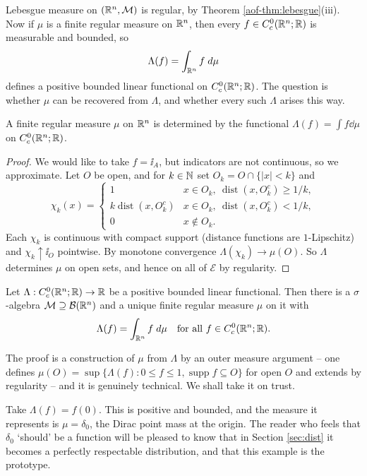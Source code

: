 \documentclass[a4paper]{scrartcl}
\DeclareMathOperator{\supp}{supp}
\DeclareMathOperator{\dist}{dist}
\begin{document}
Lebesgue measure on $(\mathbb{R}^n, \mathcal{M})$ is regular, by Theorem \ref{aof-thm:lebesgue}(iii). Now if $\mu$ is a finite regular measure on $\mathbb{R}^n$, then every $f \in C^0_c(\mathbb{R}^n;\mathbb{R})$ is measurable and bounded, so
$$\Lambda(f) = \int_{\mathbb{R}^n} f \; d \mu$$
defines a positive bounded linear functional on $C^0_c(\mathbb{R}^n;\mathbb{R})$. The question is whether $\mu$ can be recovered from $\Lambda$, and whether every such $\Lambda$ arises this way.

\begin{lemma}\label{lem:measuredetermined}
	A finite regular measure $\mu$ on $\mathbb{R}^n$ is determined by the functional $\Lambda(f) = \int f \dd\mu$ on $C_c^0(\mathbb{R}^n;\mathbb{R})$.
\end{lemma}

\begin{proof}
	We would like to take $f = \ii_A$, but indicators are not continuous, so we approximate. Let $O$ be open, and for $k \in \mathbb{N}$ set $O_k = O \cap \{|x| < k\}$ and
	$$\chi_k(x) = \begin{cases} 1 & x \in O_k, \ \dist(x, O_k^c) \ge 1/k, \\ k\dist(x, O_k^c) & x \in O_k, \ \dist(x,O_k^c) < 1/k, \\ 0 & x \notin O_k.\end{cases}$$
	Each $\chi_k$ is continuous with compact support (distance functions are $1$-Lipschitz) and $\chi_k \uparrow \ii_O$ pointwise. By monotone convergence $\Lambda(\chi_k) \to \mu(O)$. So $\Lambda$ determines $\mu$ on open sets, and hence on all of $\mathcal{E}$ by regularity.
\end{proof}

\begin{theorem}\label{thm:rieszmarkov}
	Let $\Lambda : C_c^0(\mathbb{R}^n;\mathbb{R}) \to \mathbb{R}$ be a positive bounded linear functional. Then there is a $\sigma$-algebra $\mathcal{M} \supseteq \mathcal{B}(\mathbb{R}^n)$ and a unique finite regular measure $\mu$ on it with
	$$\Lambda(f) = \int_{\mathbb{R}^n} f \; d \mu \quad \text{for all } f \in C_c^0(\mathbb{R}^n;\mathbb{R}).$$
\end{theorem}

The proof is a construction of $\mu$ from $\Lambda$ by an outer measure argument -- one defines $\mu(O) = \sup\{\Lambda(f) : 0 \le f \le 1, \supp f \subseteq O\}$ for open $O$ and extends by regularity -- and it is genuinely technical. We shall take it on trust.

\begin{example}
	Take $\Lambda(f) = f(0)$. This is positive and bounded, and the measure it represents is $\mu = \delta_0$, the Dirac point mass at the origin. The reader who feels that $\delta_0$ `should' be a function will be pleased to know that in Section \ref{sec:dist} it becomes a perfectly respectable distribution, and that this example is the prototype.
\end{example}
\end{document}
